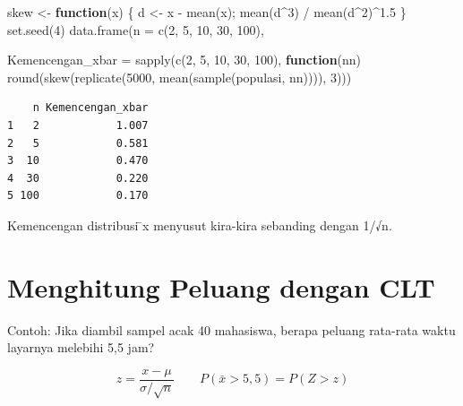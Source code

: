 \documentclass[
  indonesian,
  letterpaper,
]{book}
\newenvironment{Shaded}{\begin{snugshade}}{\end{snugshade}}
\newcommand{\AttributeTok}[1]{\textcolor[rgb]{0.40,0.45,0.13}{#1}}
\newcommand{\ControlFlowTok}[1]{\textcolor[rgb]{0.00,0.23,0.31}{\textbf{#1}}}
\newcommand{\DecValTok}[1]{\textcolor[rgb]{0.68,0.00,0.00}{#1}}
\newcommand{\FloatTok}[1]{\textcolor[rgb]{0.68,0.00,0.00}{#1}}
\newcommand{\FunctionTok}[1]{\textcolor[rgb]{0.28,0.35,0.67}{#1}}
\newcommand{\NormalTok}[1]{\textcolor[rgb]{0.00,0.23,0.31}{#1}}
\newcommand{\OtherTok}[1]{\textcolor[rgb]{0.00,0.23,0.31}{#1}}
\newcommand{\SpecialCharTok}[1]{\textcolor[rgb]{0.37,0.37,0.37}{#1}}
\begin{document}
\begin{Shaded}
\begin{Highlighting}[]
\NormalTok{skew }\OtherTok{\textless{}{-}} \ControlFlowTok{function}\NormalTok{(x) \{ d }\OtherTok{\textless{}{-}}\NormalTok{ x }\SpecialCharTok{{-}} \FunctionTok{mean}\NormalTok{(x); }\FunctionTok{mean}\NormalTok{(d}\SpecialCharTok{\^{}}\DecValTok{3}\NormalTok{) }\SpecialCharTok{/} \FunctionTok{mean}\NormalTok{(d}\SpecialCharTok{\^{}}\DecValTok{2}\NormalTok{)}\SpecialCharTok{\^{}}\FloatTok{1.5}\NormalTok{ \}}
\FunctionTok{set.seed}\NormalTok{(}\DecValTok{4}\NormalTok{)}
\FunctionTok{data.frame}\NormalTok{(}\AttributeTok{n =} \FunctionTok{c}\NormalTok{(}\DecValTok{2}\NormalTok{, }\DecValTok{5}\NormalTok{, }\DecValTok{10}\NormalTok{, }\DecValTok{30}\NormalTok{, }\DecValTok{100}\NormalTok{),}

\AttributeTok{Kemencengan\_xbar =} \FunctionTok{sapply}\NormalTok{(}\FunctionTok{c}\NormalTok{(}\DecValTok{2}\NormalTok{, }\DecValTok{5}\NormalTok{, }\DecValTok{10}\NormalTok{, }\DecValTok{30}\NormalTok{, }\DecValTok{100}\NormalTok{), }\ControlFlowTok{function}\NormalTok{(nn)}
\FunctionTok{round}\NormalTok{(}\FunctionTok{skew}\NormalTok{(}\FunctionTok{replicate}\NormalTok{(}\DecValTok{5000}\NormalTok{, }\FunctionTok{mean}\NormalTok{(}\FunctionTok{sample}\NormalTok{(populasi, nn)))), }\DecValTok{3}\NormalTok{)))}
\end{Highlighting}
\end{Shaded}

\begin{verbatim}
    n Kemencengan_xbar
1   2            1.007
2   5            0.581
3  10            0.470
4  30            0.220
5 100            0.170
\end{verbatim}

Kemencengan distribusi ̄x menyusut kira-kira sebanding dengan 1/√n.

\section{Menghitung Peluang dengan
CLT}\label{menghitung-peluang-dengan-clt}

Contoh: Jika diambil sampel acak 40 mahasiswa, berapa peluang rata-rata
waktu layarnya melebihi 5,5 jam?

\[z = \frac{x - \mu}{\sigma / \sqrt{n}} \qquad P(\bar{x} > 5{,}5) = P(Z > z)\]
\end{document}
